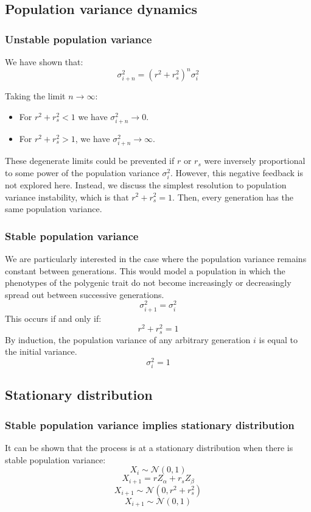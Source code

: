 \documentclass[a4paper,11pt]{article} %
\begin{document}
\subsection{Population variance dynamics}

\subsubsection*{Unstable population variance}
We have shown that:
$$\sigma_{i+n}^2 = (r^2+r_s^2)^n  \sigma_{i}^2$$

Taking the limit $n \rightarrow \infty$: 
\begin{itemize}
\item For $r^2+r_s^2 < 1$ we have $\sigma_{i+n}^2 \rightarrow 0$.
\item For  $r^2+r_s^2 > 1$, we have $\sigma_{i+n}^2 \rightarrow \infty$. 
\end{itemize}

These degenerate limits could be prevented if $r$ or $r_s$ were inversely proportional to some power of the population variance $\sigma_i^2$. However, this negative feedback is not explored here. Instead, we discuss the simplest resolution to population variance instability, which is that $r^2+r_s^2 = 1$. Then, every generation has the same population variance.

\subsubsection*{Stable population variance}
We are particularly interested in the case where the population variance remains constant between generations. This would model a population in which the phenotypes of the polygenic trait do not become increasingly or decreasingly spread out between successive generations. 
$$\sigma_{i+1}^2 = \sigma_i^2$$
This occurs if and only if:
$$r^2+r_s^2 = 1$$
%
By induction, the population variance of any arbitrary generation $i$ is equal to the initial variance. 
$$\sigma_i^2 = 1$$



\subsection{Stationary distribution}

\subsubsection*{Stable population variance implies stationary distribution}
It can be shown that the process is at a stationary distribution when there is stable population variance:
$$X_i \sim \mathcal{N}(0, 1)$$
$$X_{i+1} = r Z_\alpha + r_s Z_\beta$$
$$X_{i+1} \sim \mathcal{N}(0, r^2+r_s^2)$$
$$X_{i+1} \sim \mathcal{N}(0, 1)$$
\end{document}
